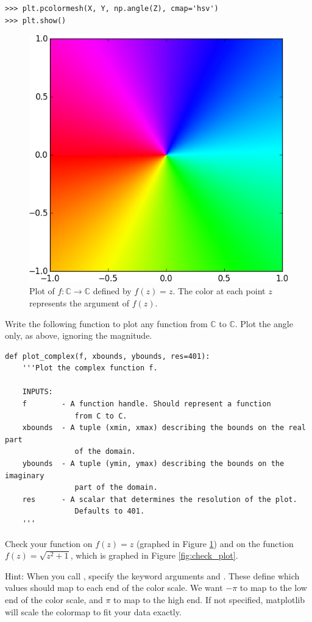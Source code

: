 \begin{lstlisting}
>>> plt.pcolormesh(X, Y, np.angle(Z), cmap='hsv')
>>> plt.show()
\end{lstlisting}


\begin{figure}
\includegraphics[width=.7\textwidth]{Identity.png}
\caption{Plot of $f: \mathbb{C} \rightarrow \mathbb{C}$ defined by $f(z)=z$. 
The color at each point $z$ represents the argument of $f(z)$.}
\label{fig:identity}
\end{figure}





\begin{problem}
Write the following function to plot any function from $\mathbb{C}$ to $\mathbb{C}$.
Plot the angle only, as above, ignoring the magnitude.
\begin{lstlisting}
def plot_complex(f, xbounds, ybounds, res=401):
    '''Plot the complex function f.
    
    INPUTS:
    f        - A function handle. Should represent a function 
    			from C to C.
    xbounds  - A tuple (xmin, xmax) describing the bounds on the real part 
    			of the domain.
    ybounds  - A tuple (ymin, ymax) describing the bounds on the imaginary 
    			part of the domain.
    res      - A scalar that determines the resolution of the plot. 
    			Defaults to 401.
    '''
\end{lstlisting}
Check your function on $f(z) = z$ (graphed in Figure \ref{fig:identity}) and on the function $f(z) = \sqrt{z^2+1}$, which is graphed in Figure \ref{fig:check_plot}.

Hint: When you call , specify the keyword arguments  and . 
These define which values should map to each end of the color scale. 
We want $-\pi$ to map to the low end of the color scale, and $\pi$ to map to the high end.
If not specified, matplotlib will scale the colormap to fit your data exactly.

\label{prob:plot_complex}
\end{problem}

